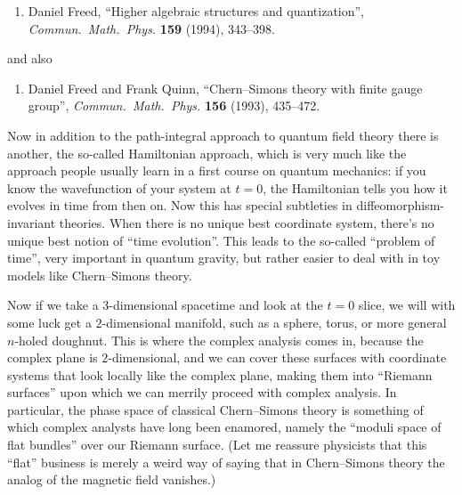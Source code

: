 \documentclass{article}
\def\tightlist{}
\begin{document}
\begin{enumerate}
\def\labelenumi{\arabic{enumi})}
\setcounter{enumi}{1}
\tightlist
\item
  Daniel Freed, ``Higher algebraic structures and quantization'',
  \emph{Commun.\ Math.\ Phys.} \textbf{159} (1994), 343--398.
\end{enumerate}
\noindent
and also

\begin{enumerate}
\def\labelenumi{\arabic{enumi})}
\setcounter{enumi}{2}
\tightlist
\item
  Daniel Freed and
  Frank Quinn, ``Chern--Simons theory with finite gauge group'', 
  \emph{Commun.\ Math.\ Phys.} \textbf{156} (1993), 435--472.
\end{enumerate}

Now in addition to the path-integral approach to quantum field theory
there is another, the so-called Hamiltonian approach, which is very much
like the approach people usually learn in a first course on quantum
mechanics: if you know the wavefunction of your system at \(t = 0\), the
Hamiltonian tells you how it evolves in time from then on. Now this has
special subtleties in diffeomorphism-invariant theories. When there is
no unique best coordinate system, there's no unique best notion of
``time evolution''. This leads to the so-called ``problem of time'',
very important in quantum gravity, but rather easier to deal with in toy
models like Chern--Simons theory.

Now if we take a \(3\)-dimensional spacetime and look at the \(t = 0\)
slice, we will with some luck get a \(2\)-dimensional manifold, such as
a sphere, torus, or more general \(n\)-holed doughnut. This is where the
complex analysis comes in, because the complex plane is
\(2\)-dimensional, and we can cover these surfaces with coordinate
systems that look locally like the complex plane, making them into
``Riemann surfaces'' upon which we can merrily proceed with complex
analysis. In particular, the phase space of classical Chern--Simons
theory is something of which complex analysts have long been enamored,
namely the ``moduli space of flat bundles'' over our Riemann surface.
(Let me reassure physicists that this ``flat'' business is merely a
weird way of saying that in Chern--Simons theory the analog of the
magnetic field vanishes.)
\end{document}
